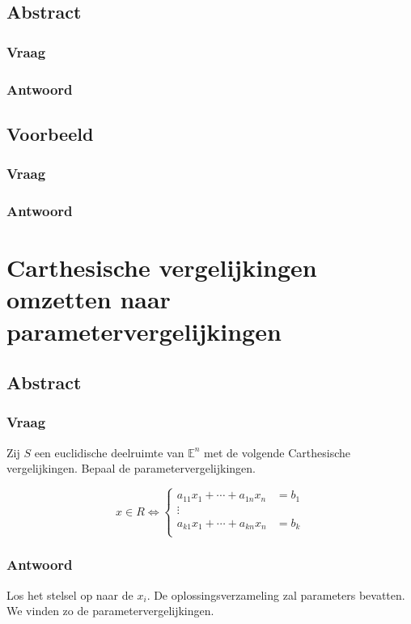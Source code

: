\documentclass[main.tex]{subfiles}
\begin{document}
\subsection*{Abstract}
\subsubsection*{Vraag}
\subsubsection*{Antwoord}

\subsection*{Voorbeeld}
\subsubsection*{Vraag}
\subsubsection*{Antwoord}

\newpage
\section{Carthesische vergelijkingen omzetten naar parametervergelijkingen}
\subsection*{Abstract}
\subsubsection*{Vraag}
\begin{center}
  Zij $S$ een euclidische deelruimte van $\mathbb{E}^{n}$ met de volgende Carthesische vergelijkingen.
  Bepaal de parametervergelijkingen.
\end{center}
\[
  x \in R \Leftrightarrow
  \left\{
    \begin{array}{cc}
      a_{11}x_{1} + \dotsb + a_{1n}x_{n} &= b_{1}\\
      \vdots\\
      a_{k1}x_{1} + \dotsb + a_{kn}x_{n} &= b_{k}\\
    \end{array}
  \right.
\]

\subsubsection*{Antwoord}
Los het stelsel op naar de $x_{i}$.
De oplossingsverzameling zal parameters bevatten.
We vinden zo de parametervergelijkingen.
\end{document}
